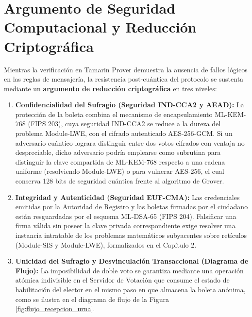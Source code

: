 \section{Argumento de Seguridad Computacional y Reducción Criptográfica}
\label{sec:argumento_seguridad_computacional}

Mientras la verificación en Tamarin Prover demuestra la ausencia de fallos lógicos en las reglas de mensajería, la resistencia post-cuántica del protocolo se sustenta mediante un \textbf{argumento de reducción criptográfica} en tres niveles:

\begin{enumerate}
	\item \textbf{Confidencialidad del Sufragio (Seguridad IND-CCA2 y AEAD):}
	La protección de la boleta combina el mecanismo de encapsulamiento ML-KEM-768 (FIPS 203), cuya seguridad IND-CCA2 se reduce a la dureza del problema Module-LWE, con el cifrado autenticado AES-256-GCM. Si un adversario cuántico lograra distinguir entre dos votos cifrados con ventaja no despreciable, dicho adversario podría emplearse como subrutina para distinguir la clave compartida de ML-KEM-768 respecto a una cadena uniforme (resolviendo Module-LWE) o para vulnerar AES-256, el cual conserva 128 bits de seguridad cuántica frente al algoritmo de Grover.

	\item \textbf{Integridad y Autenticidad (Seguridad EUF-CMA):}
	Las credenciales emitidas por la Autoridad de Registro y las boletas firmadas por el ciudadano están resguardadas por el esquema ML-DSA-65 (FIPS 204). Falsificar una firma válida sin poseer la clave privada correspondiente exige resolver una instancia intratable de los problemas matemáticos subyacentes sobre retículos (Module-SIS y Module-LWE), formalizados en el Capítulo 2.

	\item \textbf{Unicidad del Sufragio y Desvinculación Transaccional (Diagrama de Flujo):}
	La imposibilidad de doble voto se garantiza mediante una operación atómica indivisible en el Servidor de Votación que consume el estado de habilitación del elector en el mismo paso en que almacena la boleta anónima, como se ilustra en el diagrama de flujo de la Figura \ref{fig:flujo_recepcion_urna}.
\end{enumerate}

